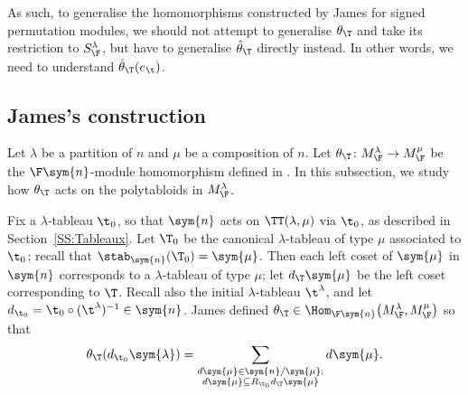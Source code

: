 As such, to generalise the homomorphisms constructed by James for signed permutation modules, we should not attempt to generalise $\theta_\T$ and take its restriction to $S_\F^{\lambda}$, but have to generalise $\hat{\theta}_\T$ directly instead. In other words, we need to understand $\hat{\theta}_\T(e_\t)$.

\subsection{James's construction}
Let $\lambda$ be a partition of $n$ and $\mu$ be a composition of $n$. Let $\theta_{\T} \colon M_\F^{\lambda} \to M_\F^{\mu}$ be the $\F\sym{n}$-module homomorphism defined in \cite[Section~13]{GJ}. In this subsection, we study how $\theta_{\T}$ acts on the polytabloids in $M_\F^{\lambda}$.

Fix a $\lambda$-tableau $\t_0$, so that $\sym{n}$ acts on $\TT(\lambda,\mu)$ via $\t_0$, as described in Section~\ref{SS:Tableaux}.
Let $\T_0$ be the canonical $\lambda$-tableau of type $\mu$ associated to $\t_0$; recall that $\stab_{\sym{n}}(\T_0) = \sym{\mu}$.
Then each left coset of $\sym{\mu}$ in $\sym{n}$ corresponds to a $\lambda$-tableau of type $\mu$; let $d_\T\sym{\mu}$ be the left coset corresponding to $\T$.
Recall also the initial $\lambda$-tableau $\t^{\lambda}$, and let $d_{\t_0} = \t_0 \circ (\t^{\lambda})^{-1} \in \sym{n}$.
James defined $\theta_\T \in \Hom_{\F\sym{n}}\big(M_\F^{\lambda}, M_\F^{\mu}\big)$ so that
\begin{gather*}\theta_{\T}(d_{\t_0}\sym{\lambda}) = \sum_{\substack{d\sym{\mu} \in \sym{n}/\sym{\mu}: \\ d\sym{\mu} \subseteq R_{\t_0} d_\T \sym{\mu}}} d \sym{\mu}.\end{gather*}

